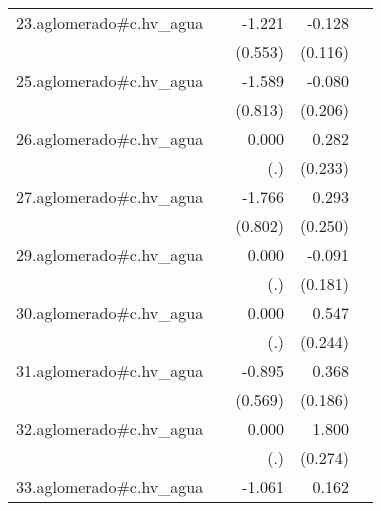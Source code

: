 {\begin{longtable}{l*{4}{D{.}{.}{-1}}}
\addlinespace
23.aglomerado#c.hv\_agua&                     &      -1.221\sym{*}  &      -0.128         &                     \\
            &                     &     (0.553)         &     (0.116)         &                     \\
\addlinespace
25.aglomerado#c.hv\_agua&                     &      -1.589         &      -0.080         &                     \\
            &                     &     (0.813)         &     (0.206)         &                     \\
\addlinespace
26.aglomerado#c.hv\_agua&                     &       0.000         &       0.282         &                     \\
            &                     &         (.)         &     (0.233)         &                     \\
\addlinespace
27.aglomerado#c.hv\_agua&                     &      -1.766\sym{*}  &       0.293         &                     \\
            &                     &     (0.802)         &     (0.250)         &                     \\
\addlinespace
29.aglomerado#c.hv\_agua&                     &       0.000         &      -0.091         &                     \\
            &                     &         (.)         &     (0.181)         &                     \\
\addlinespace
30.aglomerado#c.hv\_agua&                     &       0.000         &       0.547\sym{*}  &                     \\
            &                     &         (.)         &     (0.244)         &                     \\
\addlinespace
31.aglomerado#c.hv\_agua&                     &      -0.895         &       0.368\sym{*}  &                     \\
            &                     &     (0.569)         &     (0.186)         &                     \\
\addlinespace
32.aglomerado#c.hv\_agua&                     &       0.000         &       1.800\sym{***}&                     \\
            &                     &         (.)         &     (0.274)         &                     \\
\addlinespace
33.aglomerado#c.hv\_agua&                     &      -1.061         &       0.162         &                     \\

\end{longtable}}
